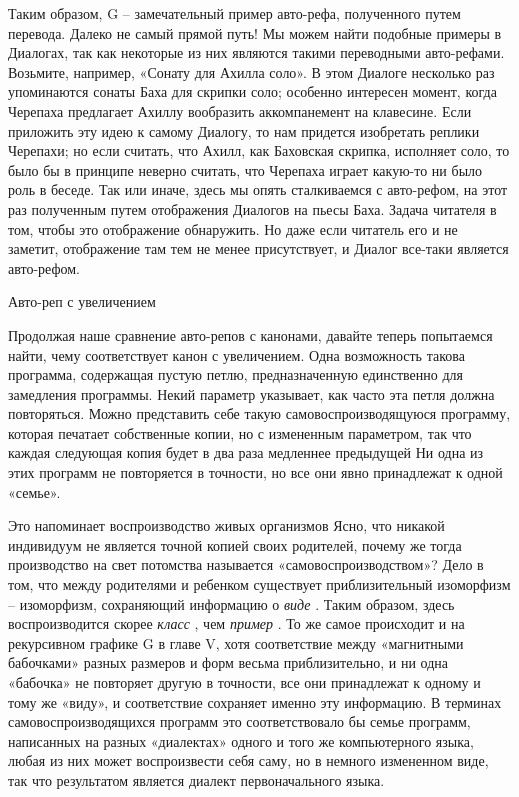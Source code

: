 \documentclass[../main.tex]{subfiles}
\begin{document}
Таким образом, G \--- замечательный пример авто-рефа, полученного путем перевода. Далеко не самый прямой путь! Мы можем найти подобные примеры в Диалогах, так как некоторые из них являются такими переводными авто-рефами. Возьмите, например, «Сонату для Ахилла соло». В этом Диалоге несколько раз упоминаются сонаты Баха для скрипки соло; особенно интересен момент, когда Черепаха предлагает Ахиллу вообразить аккомпанемент на клавесине. Если приложить эту идею к самому Диалогу, то нам придется изобретать реплики Черепахи; но если считать, что Ахилл, как Баховская скрипка, исполняет соло, то было бы в принципе неверно считать, что Черепаха играет какую-то ни было роль в беседе. Так или иначе, здесь мы опять сталкиваемся с авто-рефом, на этот раз полученным путем отображения Диалогов на пьесы Баха. Задача читателя в том, чтобы это отображение обнаружить. Но даже если читатель его и не заметит, отображение там тем не менее присутствует, и Диалог все-таки является авто-рефом.

Авто-реп с увеличением

Продолжая наше сравнение авто-репов с канонами, давайте теперь попытаемся найти, чему соответствует канон с увеличением. Одна возможность такова программа, содержащая пустую петлю, предназначенную единственно для замедления программы. Некий параметр указывает, как часто эта петля должна повторяться. Можно представить себе такую самовоспроизводящуюся программу, которая печатает собственные копии, но с измененным параметром, так что каждая следующая копия будет в два раза медленнее предыдущей Ни одна из этих программ не повторяется в точности, но все они явно принадлежат к одной «семье».

Это напоминает воспроизводство живых организмов Ясно, что никакой индивидуум не является точной копией своих родителей, почему же тогда производство на свет потомства называется «самовоспроизводством»? Дело в том, что между родителями и ребенком существует приблизительный изоморфизм \--- изоморфизм, сохраняющий информацию о \emph{виде} . Таким образом, здесь воспроизводится скорее \emph{класс} , чем \emph{пример} . То же самое происходит и на рекурсивном графике G в главе V, хотя соответствие между «магнитными бабочками» разных размеров и форм весьма приблизительно, и ни одна «бабочка» не повторяет другую в точности, все они принадлежат к одному и тому же «виду», и соответствие сохраняет именно эту информацию. В терминах самовоспроизводящихся программ это соответствовало бы семье программ, написанных на разных «диалектах» одного и того же компьютерного языка, любая из них может воспроизвести себя саму, но в немного измененном виде, так что результатом является диалект первоначального языка.
\end{document}
